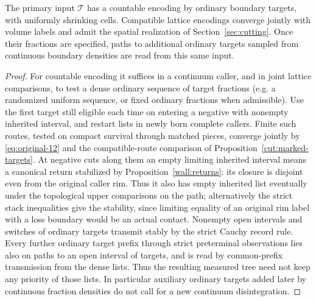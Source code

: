 \begin{lemma}\label{kern:encoding}
The primary input \(\mathcal T\) has a countable encoding by ordinary boundary targets, with
uniformly shrinking cells. Compatible lattice encodings converge jointly with volume labels and
admit the spatial realization of Section~\ref{sec:cutting}. Once their fractions are specified, paths to additional ordinary targets sampled from continuous
boundary densities are read from this same input.
\end{lemma}
\begin{proof}

For countable encoding it suffices in a continuum caller, and in joint lattice comparisons, to test a dense
ordinary sequence of target fractions (e.g. a randomized uniform sequence, or fixed ordinary fractions when
admissible). Use the first target still eligible each time on entering a negative with nonempty inherited
interval, and restart lists in newly born complete callers. Finite such routes, tested on compact survival
through matched pieces, converge jointly by \eqref{eq:original-12} and the compatible-route comparison of Proposition~\ref{cut:marked-targets}. At negative cuts along them an empty limiting inherited interval means a canonical return stabilized by Proposition~\ref{wall:returns}: its closure is disjoint even from the original caller rim. Thus it also has empty inherited list
eventually under the topological upper comparisons on the path; alternatively the strict stack inequalities
give the stability, since limiting equality of an original rim label with a loss boundary would be an actual
contact. Nonempty open intervals and switches of ordinary targets transmit stably by the strict Cauchy
record rule. Every further ordinary target prefix through strict preterminal observations lies also on paths
to an open interval of targets, and is read by common-prefix transmission from the dense lists. Thus the
resulting measured tree need not keep any priority of those lists. In particular auxiliary ordinary targets
added later by continuous fraction densities do not call for a new continuum disintegration.


\end{proof}
